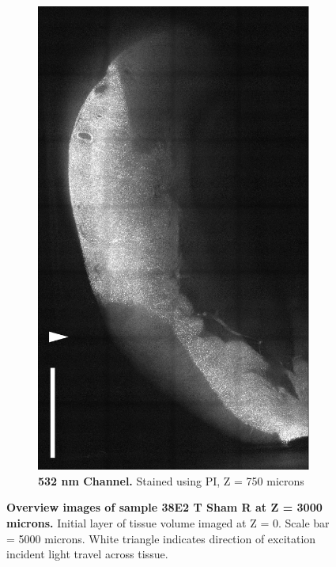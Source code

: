\begin{figure}[H]
\begin{subfigure}[t]{0.48\textwidth}
        \includegraphics[width=1\linewidth]{Images/T_Sham_R_Figure_Draft_532.png}
        \caption{\textbf{532 nm Channel.} Stained using PI, Z = 750 microns}
    \end{subfigure}    
    
\caption{\textbf{Overview images of sample 38E2 T Sham R at Z = 3000 microns.} Initial layer of tissue volume imaged at Z = 0. Scale bar = 5000 microns. White triangle indicates direction of excitation incident light travel across tissue.}  
\label{fig:enter-label}
\end{figure}


